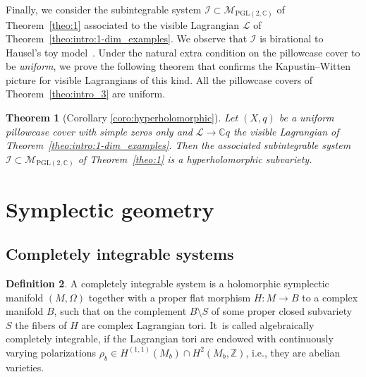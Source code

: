 \documentclass[pdftex]{sigma}
\numberwithin{equation}{section}
\newtheorem{theo}{Theorem}[section]
\theoremstyle{definition}
\newtheorem{defi}[theo]{Definition}
\renewcommand{\to}{\rightarrow}
\newcommand{\calI}{\mathcal{I}}
\newcommand{\calL}{\mathcal{L}}
\newcommand{\calM}{\mathcal{M}}
\newcommand{\ZZ}{\mathbb{Z}}
\newcommand{\CC}{\mathbb{C}}
\newcommand{\PGL}{\mathrm{PGL}}
\begin{document}
Finally, we consider the subintegrable system $\calI \subset \calM_{\PGL(2,\CC)}$ of Theorem~\ref{theo:1} associated to the visible Lagrangian $\calL$ of Theorem~\ref{theo:intro:1-dim_examples}. We observe that $\calI$ is birational to Hausel's toy model~\cite{HauselToy}. Under the natural extra condition on the pillowcase cover to be \textit{uniform}, we prove the following theorem that confirms the Kapustin--Witten picture for visible Lagrangians of this kind. All the pillowcase covers of Theorem~\ref{theo:intro_3} are uniform.

\begin{theo}[{Corollary \ref{coro:hyperholomorphic}}]
 Let $(X,q)$ be a uniform pillowcase cover with simple zeros only and $\calL \to \CC q$ the visible Lagrangian of Theorem~{\rm \ref{theo:intro:1-dim_examples}}. Then the associated subintegrable system $\calI \subset \calM_{\PGL(2,\CC)}$ of Theorem~{\rm \ref{theo:1}} is a hyperholomorphic subvariety.
\end{theo}

\section{Symplectic geometry}
\subsection{Completely integrable systems}
\begin{defi}\label{defi:integrable_system} A completely integrable system is a holomorphic symplectic manifold $(M,\Omega)$ together with a proper flat morphism $H\colon M \to B$ to a complex manifold $B$, such that on the complement $B\setminus S$ of some proper closed subvariety $S$ the fibers of $H$ are complex Lagrangian tori. It~is called algebraically completely integrable, if the Lagrangian tori are endowed with continuously varying polarizations $\rho_b \in H^{(1,1)}(M_b) \cap H^2(M_b,\ZZ)$, i.e., they are abelian varieties.
\end{defi}
\end{document}

